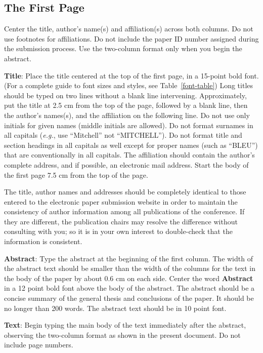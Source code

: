 \documentclass[11pt,a4paper]{article}
\begin{document}
\subsection{The First Page}
\label{ssec:first}

Center the title, author's name(s) and affiliation(s) across both
columns. Do not use footnotes for affiliations. Do not include the
paper ID number assigned during the submission process. Use the
two-column format only when you begin the abstract.

{\bf Title}: Place the title centered at the top of the first page, in
a 15-point bold font. (For a complete guide to font sizes and styles,
see Table~\ref{font-table}) Long titles should be typed on two lines
without a blank line intervening. Approximately, put the title at 2.5
cm from the top of the page, followed by a blank line, then the
author's names(s), and the affiliation on the following line. Do not
use only initials for given names (middle initials are allowed). Do
not format surnames in all capitals ({\em e.g.}, use ``Mitchell'' not
``MITCHELL'').  Do not format title and section headings in all
capitals as well except for proper names (such as ``BLEU'') that are
conventionally in all capitals.  The affiliation should contain the
author's complete address, and if possible, an electronic mail
address. Start the body of the first page 7.5 cm from the top of the
page.

The title, author names and addresses should be completely identical
to those entered to the electronic paper submission website in order
to maintain the consistency of author information among all
publications of the conference. If they are different, the publication
chairs may resolve the difference without consulting with you; so it
is in your own interest to double-check that the information is
consistent.

{\bf Abstract}: Type the abstract at the beginning of the first
column. The width of the abstract text should be smaller than the
width of the columns for the text in the body of the paper by about
0.6 cm on each side. Center the word {\bf Abstract} in a 12 point bold
font above the body of the abstract. The abstract should be a concise
summary of the general thesis and conclusions of the paper. It should
be no longer than 200 words. The abstract text should be in 10 point font.

{\bf Text}: Begin typing the main body of the text immediately after
the abstract, observing the two-column format as shown in 
the present document. Do not include page numbers.
\end{document}
